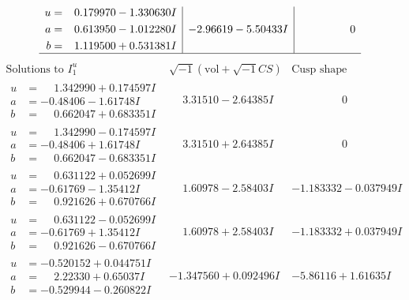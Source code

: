 \documentclass[1p]{elsarticle_modified}
\theoremstyle{definition}
\newcommand{\I}{\sqrt{-1}}
\begin{document}
$$\begin{array}{c|c|c}
\begin{aligned}
u &= \phantom{-}0.179970 - 1.330630 I \\
a &= \phantom{-}0.613950 - 1.012280 I \\
b &= \phantom{-}1.119500 + 0.531381 I\end{aligned}
 & -2.96619 - 5.50433 I & \phantom{-0.000000 } 0\\
 \hline 
 \end{array}$$\newpage$$\begin{array}{c|c|c}  
\text{Solutions to }I^u_{1}& \I (\text{vol} + \sqrt{-1}CS) & \text{Cusp shape}\\
 \hline 
\begin{aligned}
u &= \phantom{-}1.342990 + 0.174597 I \\
a &= -0.48406 - 1.61748 I \\
b &= \phantom{-}0.662047 + 0.683351 I\end{aligned}
 & \phantom{-}3.31510 - 2.64385 I & \phantom{-0.000000 } 0 \\ \hline\begin{aligned}
u &= \phantom{-}1.342990 - 0.174597 I \\
a &= -0.48406 + 1.61748 I \\
b &= \phantom{-}0.662047 - 0.683351 I\end{aligned}
 & \phantom{-}3.31510 + 2.64385 I & \phantom{-0.000000 } 0 \\ \hline\begin{aligned}
u &= \phantom{-}0.631122 + 0.052699 I \\
a &= -0.61769 - 1.35412 I \\
b &= \phantom{-}0.921626 + 0.670766 I\end{aligned}
 & \phantom{-}1.60978 - 2.58403 I & -1.183332 - 0.037949 I \\ \hline\begin{aligned}
u &= \phantom{-}0.631122 - 0.052699 I \\
a &= -0.61769 + 1.35412 I \\
b &= \phantom{-}0.921626 - 0.670766 I\end{aligned}
 & \phantom{-}1.60978 + 2.58403 I & -1.183332 + 0.037949 I \\ \hline\begin{aligned}
u &= -0.520152 + 0.044751 I \\
a &= \phantom{-}2.22330 + 0.65037 I \\
b &= -0.529944 - 0.260822 I\end{aligned}
 & -1.347560 + 0.092496 I & -5.86116 + 1.61635 I \\ \hline\begin{aligned}

\end{aligned}
\end{array}$$
\end{document}
